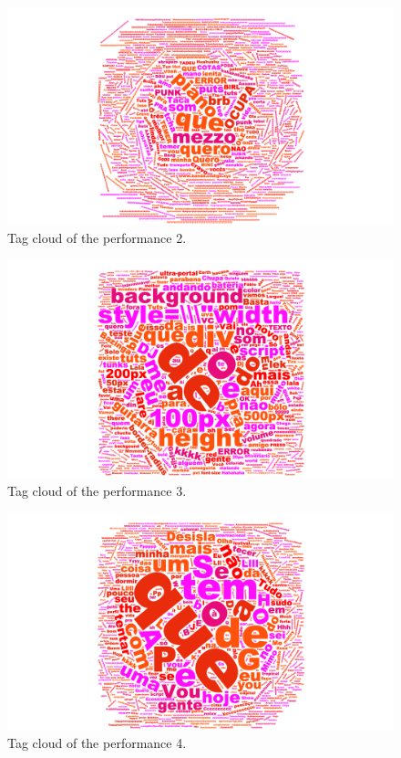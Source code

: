 \documentclass{aes2e}
\begin{document}
\begin{figure}
\centering
\includegraphics[width=1\linewidth]{img/wordcloud_performance2.png}
\caption{Tag cloud of the performance 2.}
\end{figure}

\begin{figure}
\centering
\includegraphics[width=1\linewidth]{img/wordcloud_performance3.png}
\caption{Tag cloud of the performance 3.}
\end{figure}

\begin{figure}
\centering
\includegraphics[width=1\linewidth]{img/wordcloud_performance4.png}
\caption{Tag cloud of the performance 4.}
\end{figure}
\end{document}
